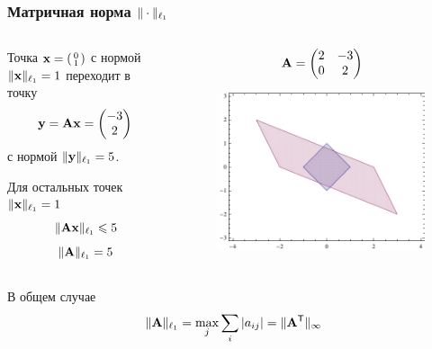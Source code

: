 \documentclass[apectratio=43,unicode]{beamer}
\begin{document}
\begin{frame}
	\frametitle{Матричная норма $\|\cdot\|_{\ell_1}$}
	\begin{columns}[T]
	\begin{column}{0.6\textwidth}
	Точка
	${\mathbf{x}} = \begin{psmallmatrix}
		0\\1
	\end{psmallmatrix}$
	 с нормой $\|{\mathbf{x}}\|_{\ell_1} = 1$ переходит в точку $${\mathbf{y}} = {\mathbf{A}}{\mathbf{x}} = \begin{pmatrix}
		-3\\2
	\end{pmatrix}$$
	 с нормой $\|{\mathbf{y}}\|_{\ell_1} = 5$.

	Для остальных точек $\|{\mathbf{x}}\|_{\ell_1} = 1$
	$$\|{\mathbf{A}}{\mathbf{x}}\|_{\ell_1} \leqslant 5$$
	$$
	\|{\mathbf{A}}\|_{\ell_1} = 5
	$$
	\end{column}

	\begin{column}{0.4\textwidth}
	$$
	{\mathbf{A}} = \begin{pmatrix}
		2&-3\\
		0&2
	\end{pmatrix}
	$$
	\begin{figure}%
	\includegraphics[width=\columnwidth]{l1.pdf}%
	\end{figure}
	\end{column}
	\end{columns}
	\begin{block}{В общем случае}
	$$
	\|{\mathbf{A}}\|_{\ell_1} = \max_j \sum_i |a_{ij}| = \|{\mathbf{A}}^{\mathsf{T}}\|_\infty
	$$
	\end{block}
\end{frame}
\end{document}
